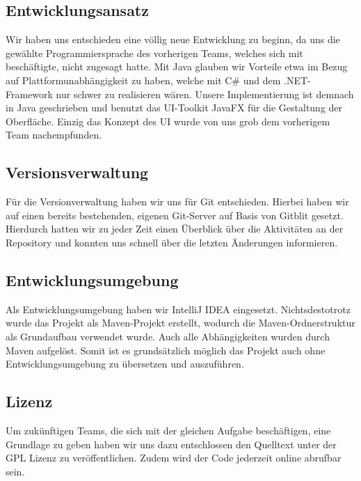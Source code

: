 \subsection{Entwicklungsansatz}
Wir haben uns entschieden eine völlig neue Entwicklung zu beginn, da uns die gewählte
Programmiersprache des vorherigen Teams, welches sich mit \textFlowDesign{} beschäftigte,
nicht zugesagt hatte. Mit Java glauben wir Vorteile etwa im Bezug auf 
Plattformunabhängigkeit zu haben, welche mit C\# und dem .NET-Framework nur schwer zu
realisieren wären. \newline
Unsere Implementierung ist demnach in Java geschrieben und benutzt das UI-Toolkit JavaFX
für die Gestaltung der Oberfläche. \newline
Einzig das Konzept des UI wurde von uns grob dem vorherigem Team nachempfunden.

\subsection{Versionsverwaltung}
Für die Versionverwaltung haben wir uns für Git entschieden. Hierbei haben wir auf einen
bereits bestehenden, eigenen Git-Server auf Basis von Gitblit gesetzt. Hierdurch hatten
wir zu jeder Zeit einen Überblick über die Aktivitäten an der Repository und konnten
uns schnell über die letzten Änderungen informieren.

\subsection{Entwicklungsumgebung}
Als Entwicklungsumgebung haben wir IntelliJ IDEA eingesetzt. Nichtsdestotrotz wurde das Projekt
als Maven-Projekt erstellt, wodurch die Maven-Ordnerstruktur als Grundaufbau verwendet wurde.
Auch alle Abhängigkeiten wurden durch Maven aufgelöst. Somit ist es grundsätzlich möglich das
Projekt auch ohne Entwicklungsumgebung zu übersetzen und auszuführen.

\subsection{Lizenz}
Um zukünftigen Teams, die sich mit der gleichen Aufgabe beschäftigen, eine Grundlage zu geben
haben wir uns dazu entschlossen den Quelltext unter der GPL Lizenz zu veröffentlichen. Zudem
wird der Code jederzeit online abrufbar sein.